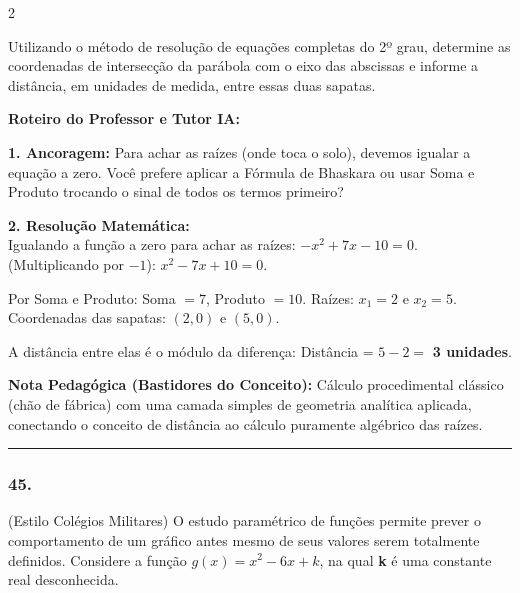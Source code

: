 \begin{multicols*}{2}
\begin{enunciadoLiteral}
Utilizando o método de resolução de equações completas do 2º grau, determine as coordenadas de intersecção da parábola com o eixo das abscissas e informe a distância, em unidades de medida, entre essas duas sapatas.
\end{enunciadoLiteral}

\ifgabarito
    \begin{tcolorbox}[colback=CorTitUm!5, colframe=CorTitUm, boxrule=1pt, arc=4pt, left=6pt, right=6pt, top=6pt, bottom=6pt]
    \small\textbf{\textcolor{CorTitUm}{Roteiro do Professor e Tutor IA:}}\par\vspace{0.1cm}
    \color{CinzaEscuro}
    \textbf{1. Ancoragem:} Para achar as raízes (onde toca o solo), devemos igualar a equação a zero. Você prefere aplicar a Fórmula de Bhaskara ou usar Soma e Produto trocando o sinal de todos os termos primeiro?\par\vspace{0.1cm}
    \textbf{2. Resolução Matemática:}\\
    Igualando a função a zero para achar as raízes:
    $-x^2 + 7x - 10 = 0$. (Multiplicando por $-1$):
    $x^2 - 7x + 10 = 0$.
    
    Por Soma e Produto:
    Soma $= 7$, Produto $= 10$. Raízes: $x_1 = 2$ e $x_2 = 5$.
    Coordenadas das sapatas: $(2, 0)$ e $(5, 0)$.
    
    A distância entre elas é o módulo da diferença:
    Distância = $5 - 2 =$ \textbf{3 unidades}.
    \end{tcolorbox}
    \vspace{0.15cm}
    
    \begin{boxexplicacao}
    \textbf{Nota Pedagógica (Bastidores do Conceito):} Cálculo procedimental clássico (chão de fábrica) com uma camada simples de geometria analítica aplicada, conectando o conceito de distância ao cálculo puramente algébrico das raízes.
    \end{boxexplicacao}
\fi

\par\vspace{\espacoQuestao}

\noindent\textcolor{CorLinha}{\rule{\linewidth}{0.5pt}} 
\par\vspace{\espacoPreQuestao}
\subsubsection*{45.} 
\begin{enunciadoLiteral}
(Estilo Colégios Militares) O estudo paramétrico de funções permite prever o comportamento de um gráfico antes mesmo de seus valores serem totalmente definidos. Considere a função $g(x) = x^2 - 6x + k$, na qual \textbf{k} é uma constante real desconhecida.


\end{enunciadoLiteral}
\end{multicols*}
